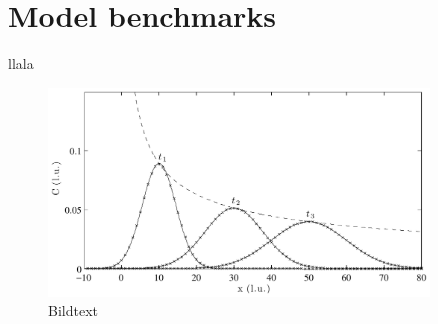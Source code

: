 \chapter{Model benchmarks}
llala
\begin{figure}
\begin{center}
\includegraphics[width=0.9\textwidth]{../fig/adv_dif_10_30_50.pdf}
\end{center}
\caption{\small\label{label}Bildtext}
\end{figure}